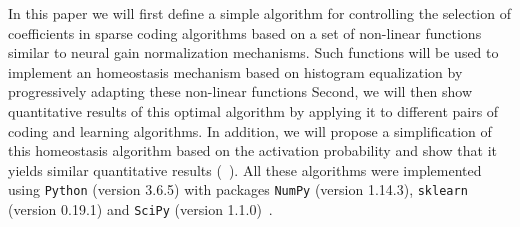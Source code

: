 \documentclass[draft]{article} %
\begin{document}
In this paper we will first define a simple algorithm for controlling the selection of coefficients in sparse coding algorithms based on a set of non-linear functions similar to neural gain normalization mechanisms. Such functions will be used to implement an homeostasis mechanism based on histogram equalization by progressively adapting these non-linear functions
Second, we will then show quantitative results of this optimal algorithm by applying it to different pairs of coding and learning algorithms. %
In addition, we will propose a simplification of this homeostasis algorithm based on the activation probability and show that it yields similar quantitative results (~\citep{Olshausen97, Sandin17}).
All these algorithms were implemented using \verb+Python+ (version 3.6.5)
with packages \verb+NumPy+ (version 1.14.3), \verb+sklearn+ (version 0.19.1) and \verb+SciPy+ (version 1.1.0)~\citep{Oliphant07}.
\end{document}
